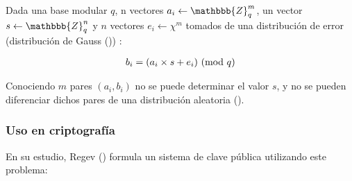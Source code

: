 Dada una base modular $q$, n vectores $a_i \leftarrow \mathbbb{Z}^m_q$, un vector $s \leftarrow \mathbbb{Z}^n_q$ y $n$ vectores $ e_i \leftarrow \chi{}^m $ tomados de una distribución de error (distribución de Gauss (\cite{wikipedia_contributors._generalized_2019})) \chi{} \subset{} :

\begin{gather}
    \label{form:gen_lwe}
    b_i = (a_i \times s + e_i) \ (\mathrm{mod}\ q)
\end{gather}

Conociendo $m$ pares $(a_i, b_i)$ no se puede determinar el valor $s$, y no se pueden diferenciar dichos pares de una distribución aleatoria (\cite{t._zijlstra_learning_nodate}).

\subsubsection{Uso en criptografía}

En su estudio, Regev (\cite{regev_learning_2010}) formula un sistema de clave pública utilizando este problema:

